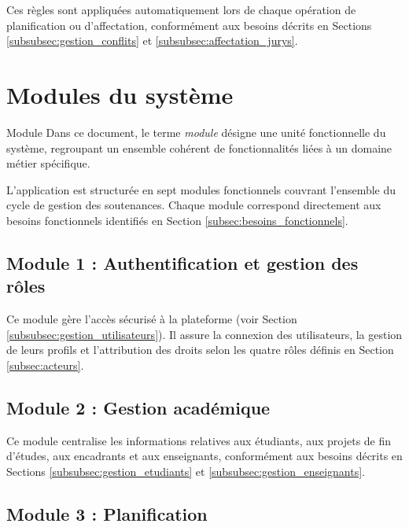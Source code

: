 \documentclass[12pt,a4paper]{article}
\begin{document}
Ces règles sont appliquées automatiquement lors de chaque opération de
planification ou d'affectation, conformément aux besoins décrits en Sections
\ref{subsubsec:gestion_conflits} et \ref{subsubsec:affectation_jurys}.

\section{Modules du système}

\begin{projectbox}{Module}
    Dans ce document, le terme \textit{module} désigne une unité fonctionnelle du système,
    regroupant un ensemble cohérent de fonctionnalités liées à un domaine métier spécifique.
\end{projectbox}

\label{sec:modules}

L'application est structurée en sept modules fonctionnels couvrant l'ensemble du
cycle de gestion des soutenances. Chaque module correspond directement aux besoins
fonctionnels identifiés en Section \ref{subsec:besoins_fonctionnels}.

\subsection{Module 1 : Authentification et gestion des rôles}
\label{subsec:module_auth}

Ce module gère l'accès sécurisé à la plateforme (voir Section
\ref{subsubsec:gestion_utilisateurs}). Il assure la connexion des utilisateurs,
la gestion de leurs profils et l'attribution des droits selon les quatre rôles
définis en Section \ref{subsec:acteurs}.

\subsection{Module 2 : Gestion académique}
\label{subsec:module_academique}

Ce module centralise les informations relatives aux étudiants, aux projets de
fin d'études, aux encadrants et aux enseignants, conformément aux besoins décrits
en Sections \ref{subsubsec:gestion_etudiants} et \ref{subsubsec:gestion_enseignants}.

\subsection{Module 3 : Planification}
\label{subsec:module_planification}
\end{document}
